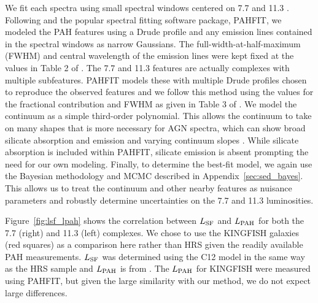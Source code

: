 \documentclass[fleqn, usenatbib]{mnras}
\begin{document}
We fit each spectra using small spectral windows centered on 7.7 and 11.3 \micron. Following \citet{Smith:2007lr} and the popular spectral fitting software package, PAHFIT, we modeled the PAH features using a Drude profile and any emission lines contained in the spectral windows as narrow Gaussians. The full-width-at-half-maximum (FWHM) and central wavelength of the emission lines were kept fixed at the values in Table 2 of \citet{Smith:2007lr}. The 7.7 and 11.3 \micron{} features are actually complexes with multiple subfeatures. PAHFIT models these with multiple Drude profiles chosen to reproduce the observed features and we follow this method using the values for the fractional contribution and FWHM as given in Table 3 of \citet{Smith:2007lr}. We model the continuum as a simple third-order polynomial. This allows the continuum to take on many shapes that is more necessary for AGN spectra, which can show broad silicate absorption and emission and varying continuum slopes \citep{Baum:2010kh, Spoon:2007oq, Wu:2009pt}. While silicate absorption is included within PAHFIT, silicate emission is absent prompting the need for our own modeling. Finally, to determine the best-fit model, we again use the Bayesian methodology and MCMC described in Appendix~\ref{sec:sed_bayes}. This allows us to treat the continuum and other nearby features as nuisance parameters and robustly determine uncertainties on the 7.7 and 11.3 \micron{} luminosities.

Figure~\ref{fig:lsf_lpah} shows the correlation between $L_{\rm SF}$ and $L_{\rm PAH}$ for both the 7.7 (right) and 11.3 \micron{} (left) complexes. We chose to use the KINGFISH galaxies (red squares) as a comparison here rather than HRS given the readily available PAH measurements. $L_{\rm SF}$ was determined using the C12 model in the same way as the HRS sample and $L_{\rm PAH}$ is from \citet{Smith:2007lr}. The $L_{\rm PAH}$ for KINGFISH were measured using PAHFIT, but given the large similarity with our method, we do not expect large differences.
\end{document}
